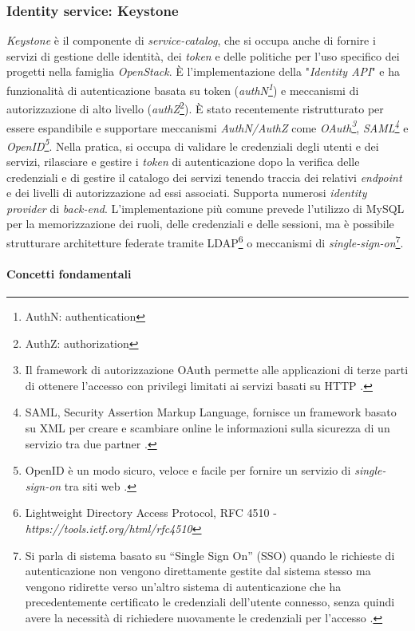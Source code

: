 \documentclass[../main.tex]{subfiles}
\begin{document}
\subsubsection{Identity service: Keystone}
\textit{Keystone} è il componente di \textit{service-catalog}, che si occupa anche di fornire i servizi di gestione delle identità, dei \textit{token} e delle politiche per l'uso specifico dei progetti nella famiglia \textit{OpenStack}.
\`E l'implementazione della "\textit{Identity API}" e ha funzionalità di autenticazione basata su token (\textit{authN\footnote{AuthN: authentication}}) e meccanismi di autorizzazione di alto livello (\textit{authZ}\footnote{AuthZ: authorization}).
\`E stato recentemente ristrutturato per essere espandibile e supportare meccanismi \textit{AuthN/AuthZ} come \textit{OAuth\footnote{Il framework di autorizzazione OAuth permette alle applicazioni di terze parti di ottenere l'accesso con privilegi limitati ai servizi basati su HTTP \cite{OAuth}.}}, \textit{SAML\footnote{SAML, Security Assertion Markup Language, fornisce un framework basato su XML per creare e scambiare online le informazioni sulla sicurezza di un servizio tra due partner \cite{SAML}.}} e \textit{OpenID\footnote{OpenID è un modo sicuro, veloce e facile per fornire un servizio di \textit{single-sign-on} tra siti web \cite{OpenID}.}}.
Nella pratica, si occupa di validare le credenziali degli utenti e dei servizi, rilasciare e gestire i \textit{token} di autenticazione dopo la verifica delle credenziali e di gestire il catalogo dei servizi tenendo traccia dei relativi \textit{endpoint} e dei livelli di autorizzazione ad essi associati.
Supporta numerosi \textit{identity provider} di \textit{back-end}. L'implementazione più comune prevede l'utilizzo di MySQL per la memorizzazione dei ruoli, delle credenziali e delle sessioni, ma è possibile strutturare architetture federate tramite LDAP\footnote{Lightweight Directory Access Protocol, RFC 4510 - \textit{https://tools.ietf.org/html/rfc4510}} o meccanismi di \textit{single-sign-on}\footnote{Si parla di sistema basato su “Single Sign On” (SSO) quando le richieste di autenticazione non vengono direttamente gestite dal sistema stesso ma vengono ridirette verso un’altro sistema di autenticazione che ha precedentemente certificato le credenziali dell’utente connesso, senza quindi avere la necessità di richiedere nuovamente le credenziali per l’accesso \cite{SSO}.}.

\paragraph{Concetti fondamentali}
\end{document}
